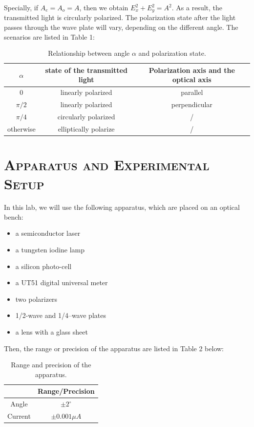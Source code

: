 \documentclass[a4paper,12pt]{article}
\begin{document}
Specially, if $A_e = A_o = A$, then we obtain $E_x^2 + E_y^2 = A^2$. As a result, the transmitted light is circularly polarized. The polarization state after the light passes through the wave plate will vary, depending on the different angle. The scenarios are listed in Table 1:

\begin{table}[h]
\begin{center}
\begin{tabular}{|c|c|c|}
\hline
$\alpha$ & state of the transmitted light & Polarization axis and the optical axis \\
\hline 
0 & linearly polarized & parallel \\
\hline
$\pi/2$ & linearly polarized & perpendicular \\
\hline
$\pi/4$ & circularly polarized & / \\
\hline
otherwise & elliptically polarize & / \\
\hline
\end{tabular}
\caption{Relationship between angle $\alpha$ and polarization state.}
\end{center}
\end{table}



\section{\textsc{Apparatus and Experimental Setup}}
In this lab, we will use the following apparatus, which are placed on an optical bench:
\begin{itemize}
\item a semiconductor laser
\item a tungsten iodine lamp
\item a silicon photo-cell
\item a UT51 digital universal meter
\item two polarizers
\item 1/2-wave and 1/4–wave plates
\item a lens with a glass sheet
\end{itemize}

Then, the range or precision of the apparatus are listed in Table 2 below:

\begin{table}[h]
\begin{center}
\begin{tabular}{|c|c|}
\hline
 & Range/Precision \\
\hline
Angle & $ \pm 2^{\circ} $ \\
\hline
Current & $ \pm 0.001 \mu A $ \\
\hline
\end{tabular}
\caption{Range and precision of the apparatus.}
\end{center}
\end{table}
\end{document}
